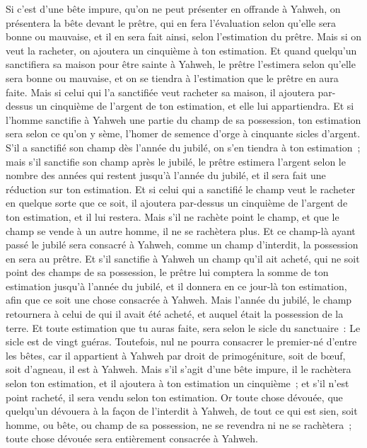 \begin{multicols}{2}
Si c'est d'une bête impure, qu'on ne peut présenter en offrande à Yahweh, on présentera la bête devant le prêtre,
qui en fera l'évaluation selon qu'elle sera bonne ou mauvaise, et il en sera fait ainsi, selon l'estimation du prêtre.
Mais si on veut la racheter, on ajoutera un cinquième à ton estimation.
Et quand quelqu'un sanctifiera sa maison pour être sainte à Yahweh, le prêtre l'estimera selon qu'elle sera bonne ou mauvaise, et on se tiendra à l'estimation que le prêtre en aura faite.
Mais si celui qui l'a sanctifiée veut racheter sa maison, il ajoutera par-dessus un cinquième de l'argent de ton estimation, et elle lui appartiendra.
Et si l'homme sanctifie à Yahweh une partie du champ de sa possession, ton estimation sera selon ce qu'on y sème, l'homer de semence d'orge à cinquante sicles d'argent.
S'il a sanctifié son champ dès l'année du jubilé, on s'en tiendra à ton estimation~;
mais s'il sanctifie son champ après le jubilé, le prêtre estimera l'argent selon le nombre des années qui restent jusqu'à l'année du jubilé, et il sera fait une réduction sur ton estimation.
Et si celui qui a sanctifié le champ veut le racheter en quelque sorte que ce soit, il ajoutera par-dessus un cinquième de l'argent de ton estimation, et il lui restera.
Mais s'il ne rachète point le champ, et que le champ se vende à un autre homme, il ne se rachètera plus.
Et ce champ-là ayant passé le jubilé sera consacré à Yahweh, comme un champ d'interdit, la possession en sera au prêtre.
Et s'il sanctifie à Yahweh un champ qu'il ait acheté, qui ne soit point des champs de sa possession,
le prêtre lui comptera la somme de ton estimation jusqu'à l'année du jubilé, et il donnera en ce jour-là ton estimation, afin que ce soit une chose consacrée à Yahweh.
Mais l'année du jubilé, le champ retournera à celui de qui il avait été acheté, et auquel était la possession de la terre.
Et toute estimation que tu auras faite, sera selon le sicle du sanctuaire~: Le sicle est de vingt guéras.
Toutefois, nul ne pourra consacrer le premier-né d'entre les bêtes, car il appartient à Yahweh par droit de primogéniture, soit de bœuf, soit d'agneau, il est à Yahweh.
Mais s'il s'agit d'une bête impure, il le rachètera selon ton estimation, et il ajoutera à ton estimation un cinquième~; et s'il n'est point racheté, il sera vendu selon ton estimation.
Or toute chose dévouée, que quelqu'un dévouera à la façon de l'interdit à Yahweh, de tout ce qui est sien, soit homme, ou bête, ou champ de sa possession, ne se revendra ni ne se rachètera~; toute chose dévouée sera entièrement consacrée à Yahweh.

\end{multicols}
